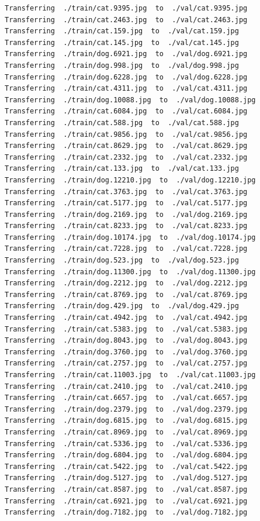 \documentclass[]{book}
\theoremstyle{definition}
\theoremstyle{definition}
\theoremstyle{definition}
\theoremstyle{remark}
\begin{document}
\begin{verbatim}
Transferring  ./train/cat.9395.jpg  to  ./val/cat.9395.jpg
Transferring  ./train/cat.2463.jpg  to  ./val/cat.2463.jpg
Transferring  ./train/cat.159.jpg  to  ./val/cat.159.jpg
Transferring  ./train/cat.145.jpg  to  ./val/cat.145.jpg
Transferring  ./train/dog.6921.jpg  to  ./val/dog.6921.jpg
Transferring  ./train/dog.998.jpg  to  ./val/dog.998.jpg
Transferring  ./train/dog.6228.jpg  to  ./val/dog.6228.jpg
Transferring  ./train/cat.4311.jpg  to  ./val/cat.4311.jpg
Transferring  ./train/dog.10088.jpg  to  ./val/dog.10088.jpg
Transferring  ./train/cat.6084.jpg  to  ./val/cat.6084.jpg
Transferring  ./train/cat.588.jpg  to  ./val/cat.588.jpg
Transferring  ./train/cat.9856.jpg  to  ./val/cat.9856.jpg
Transferring  ./train/cat.8629.jpg  to  ./val/cat.8629.jpg
Transferring  ./train/cat.2332.jpg  to  ./val/cat.2332.jpg
Transferring  ./train/cat.133.jpg  to  ./val/cat.133.jpg
Transferring  ./train/dog.12210.jpg  to  ./val/dog.12210.jpg
Transferring  ./train/cat.3763.jpg  to  ./val/cat.3763.jpg
Transferring  ./train/cat.5177.jpg  to  ./val/cat.5177.jpg
Transferring  ./train/dog.2169.jpg  to  ./val/dog.2169.jpg
Transferring  ./train/cat.8233.jpg  to  ./val/cat.8233.jpg
Transferring  ./train/dog.10174.jpg  to  ./val/dog.10174.jpg
Transferring  ./train/cat.7228.jpg  to  ./val/cat.7228.jpg
Transferring  ./train/dog.523.jpg  to  ./val/dog.523.jpg
Transferring  ./train/dog.11300.jpg  to  ./val/dog.11300.jpg
Transferring  ./train/dog.2212.jpg  to  ./val/dog.2212.jpg
Transferring  ./train/cat.8769.jpg  to  ./val/cat.8769.jpg
Transferring  ./train/dog.429.jpg  to  ./val/dog.429.jpg
Transferring  ./train/cat.4942.jpg  to  ./val/cat.4942.jpg
Transferring  ./train/cat.5383.jpg  to  ./val/cat.5383.jpg
Transferring  ./train/dog.8043.jpg  to  ./val/dog.8043.jpg
Transferring  ./train/dog.3760.jpg  to  ./val/dog.3760.jpg
Transferring  ./train/cat.2757.jpg  to  ./val/cat.2757.jpg
Transferring  ./train/cat.11003.jpg  to  ./val/cat.11003.jpg
Transferring  ./train/cat.2410.jpg  to  ./val/cat.2410.jpg
Transferring  ./train/cat.6657.jpg  to  ./val/cat.6657.jpg
Transferring  ./train/dog.2379.jpg  to  ./val/dog.2379.jpg
Transferring  ./train/dog.6815.jpg  to  ./val/dog.6815.jpg
Transferring  ./train/cat.8969.jpg  to  ./val/cat.8969.jpg
Transferring  ./train/cat.5336.jpg  to  ./val/cat.5336.jpg
Transferring  ./train/dog.6804.jpg  to  ./val/dog.6804.jpg
Transferring  ./train/cat.5422.jpg  to  ./val/cat.5422.jpg
Transferring  ./train/dog.5127.jpg  to  ./val/dog.5127.jpg
Transferring  ./train/cat.8587.jpg  to  ./val/cat.8587.jpg
Transferring  ./train/cat.6921.jpg  to  ./val/cat.6921.jpg
Transferring  ./train/dog.7182.jpg  to  ./val/dog.7182.jpg

\end{verbatim}
\end{document}

